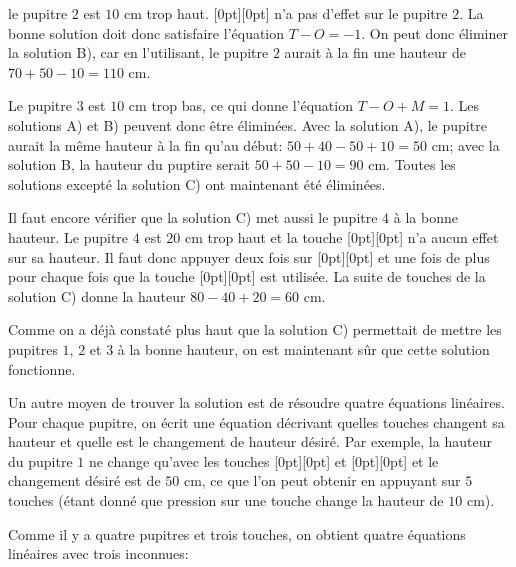 {{le pupitre $2$ est $10$ cm trop haut. \raisebox{-0.5ex}[0pt][0pt]{} n’a pas d’effet sur le pupitre $2$. La bonne solution doit donc satisfaire l’équation ${T - O = -1}$. On peut donc éliminer la solution B), car en l’utilisant, le pupitre $2$ aurait à la fin une hauteur de ${70 + 50 - 10 = 110}$ cm.

Le pupitre $3$ est $10$ cm trop bas, ce qui donne l’équation ${T - O + M = 1}$. Les solutions A) et B) peuvent donc être éliminées. Avec la solution A), le pupitre aurait la même hauteur à la fin qu’au début: ${50 + 40 - 50 + 10 = 50}$ cm; avec la solution B, la hauteur du puptire serait ${50 + 50 - 10 = 90}$ cm. Toutes les solutions excepté la solution C) ont maintenant été éliminées.

Il faut encore vérifier que la solution C) met aussi le pupitre $4$ à la bonne hauteur. Le pupitre $4$ est $20$ cm trop haut et la touche \raisebox{-0.5ex}[0pt][0pt]{} n’a aucun effet sur sa hauteur. Il faut donc appuyer deux fois sur \raisebox{-0.5ex}[0pt][0pt]{} et une fois de plus pour chaque fois que la touche \raisebox{-0.5ex}[0pt][0pt]{} est utilisée. La suite de touches de la solution C) donne la hauteur ${80 - 40 + 20 = 60}$ cm.

Comme on a déjà constaté plus haut que la solution C) permettait de mettre les pupitres $1$, $2$ et $3$ à la bonne hauteur, on est maintenant sûr que cette solution fonctionne.

Un autre moyen de trouver la solution est de résoudre quatre équations linéaires. Pour chaque pupitre, on écrit une équation décrivant quelles touches changent sa hauteur et quelle est le changement de hauteur désiré. Par exemple, la hauteur du pupitre $1$ ne change qu’avec les touches \raisebox{-0.5ex}[0pt][0pt]{} et \raisebox{-0.5ex}[0pt][0pt]{} et le changement désiré est de ${50}$ cm, ce que l’on peut obtenir en appuyant sur $5$ touches (étant donné que pression sur une touche change la hauteur de ${10}$ cm).

Comme il y a quatre pupitres et trois touches, on obtient quatre équations linéaires avec trois inconnues:

}}
